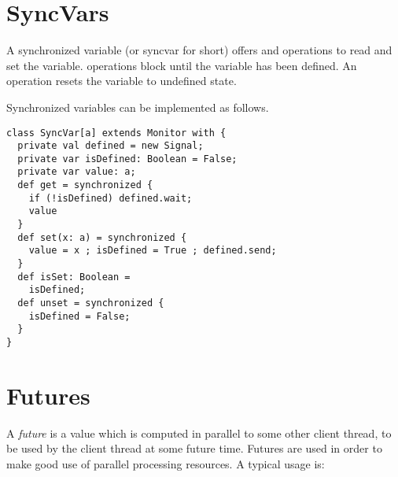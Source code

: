 \documentclass[11pt]{report}
\begin{document}

\section{SyncVars}

A synchronized variable (or syncvar for short) offers \verb@get@ and
\verb@put@ operations to read and set the variable. \verb@get@ operations
block until the variable has been defined. An \verb@unset@ operation
resets the variable to undefined state.

Synchronized variables can be implemented as follows.
\begin{verbatim}
class SyncVar[a] extends Monitor with {
  private val defined = new Signal;
  private var isDefined: Boolean = False;
  private var value: a;
  def get = synchronized {
    if (!isDefined) defined.wait;
    value
  }
  def set(x: a) = synchronized {
    value = x ; isDefined = True ; defined.send;
  }
  def isSet: Boolean =
    isDefined;
  def unset = synchronized {
    isDefined = False;
  }
}
\end{verbatim}

\section{Futures}
\label{sec:futures}

A {\em future} is a value which is computed in parallel to some other
client thread, to be used by the client thread at some future time.
Futures are used in order to make good use of parallel processing
resources.  A typical usage is:
\end{document}
